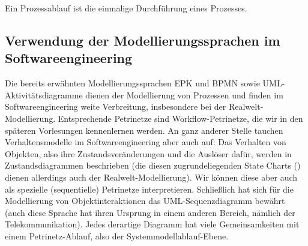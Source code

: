 \vspace{-\baselineskip} %
\vspace{-2mm} %

{Ein Prozessablauf ist die einmalige Durchführung eines Prozesses.}

\vspace{-\baselineskip} %

\subsection*{Verwendung der Modellierungssprachen im Softwareengineering}

Die bereits erwähnten Modellierungssprachen EPK und BPMN sowie UML-Akti\-vi\-täts\-dia\-gramme dienen der Modellierung von Prozessen und finden im Software\-engineering weite Verbreitung, insbesondere bei der Realwelt-Modellierung. Entsprechende Petrinetze sind Workflow-Petrinetze, die wir in den späteren Vorlesungen kennenlernen werden. An ganz anderer Stelle tauchen Verhaltensmodelle im Softwareengineering aber auch auf: Das Verhalten von Objekten, also ihre Zustands\-veränderungen und die Auslöser dafür, werden in Zustandsdiagrammen beschrieben (die diesen zugrundeliegenden State Charts (\cite{har87}) dienen allerdings auch der Realwelt-Modellierung). Wir können diese aber auch als spezielle (sequentielle) Petrinetze interpretieren. Schließlich hat sich für die Modellierung von Objekt\-interaktionen das UML-Sequenzdiagramm bewährt (auch diese Sprache hat ihren Ursprung in einem anderen Bereich, nämlich der Telekommunikation). Jedes derartige Diagramm hat viele Gemeinsamkeiten mit einem Petrinetz-Ablauf, also der Systemmodellablauf-Ebene. 
